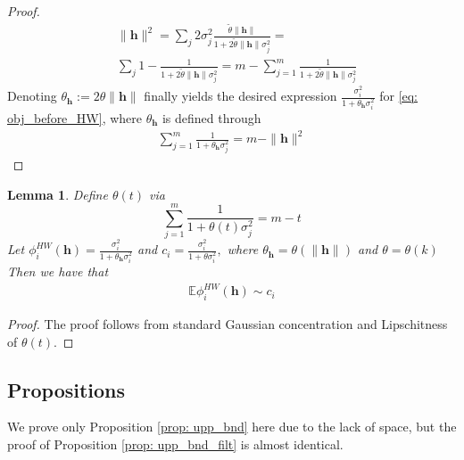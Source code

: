 \documentclass[conference]{IEEEtran}
\newcommand{\bh}{\mathbf{h}}
\newcommand{\bbE}{\mathbb{E}}
\newtheorem{lemma}{Lemma}
\begin{document}
\begin{proof}
\begin{align*}
& \|\mathbf{h}\|^2 = \sum_j 2 \sigma_j^2 \frac{\tilde{\theta}\|\mathbf{h}\| }{1 + 2\tilde{\theta}\|\mathbf{h}\|\sigma_j^2} = \\
&  \sum_j 1 - \frac{1}{1 + 2\tilde{\theta}\|\mathbf{h}\|\sigma_j^2} = m - \sum_{j=1}^m \frac{1}{1 + 2\tilde{\theta}\|\mathbf{h}\|\sigma_j^2}
\end{align*}
Denoting $\theta_{\bh} := 2\theta \|\mathbf{h}\|$ finally yields the desired expression $\frac{\sigma_i^2}{1 +\theta_{\bh} \sigma_i^2}$ for \eqref{eq: obj_before_HW}, where $\theta_{\bh}$ is defined through
\begin{align*}
\sum_{j=1}^m \frac{1}{1 + \theta_\bh \sigma_j^2} = m - \|\mathbf{h}\|^2 
\end{align*}

\end{proof}

\begin{lemma}\label{lm: phi_hw_exp}
 Define $\theta(t)$ via 
$$\sum_{j=1}^m \frac{1}{1 + \theta(t) \sigma_j^2} = m - t$$
Let $\phi^{HW}_i(\mathbf{h}) = \frac{\sigma_i^2}{1 +\theta_{\bh} \sigma_i^2}$ and $c_i = \frac{\sigma_i^2}{1 +\theta\sigma_i^2}, $ where $\theta_{\bh} = \theta(\|\bh\|)$ and $\theta = \theta(k)$
Then we have that
\begin{align*}
    \bbE \phi^{HW}_i(\mathbf{h}) \sim c_i
\end{align*}
\end{lemma}

\begin{proof}
    The proof follows from standard Gaussian concentration and Lipschitness of $\theta(t)$.
\end{proof}

\subsection{Propositions}

We prove only Proposition \ref{prop: upp_bnd} here due to the lack of space, but the proof of Proposition \ref{prop: upp_bnd_filt} is almost identical.  
\end{document}
